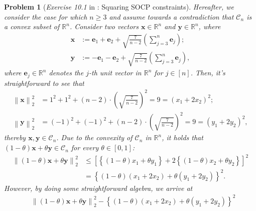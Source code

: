 \documentclass[11pt]{article}
\newtheorem{problem}{Problem}
\numberwithin{equation}{problem}
\begin{document}
\begin{problem} [\emph{Exercise 10.1} in \cite{calafiore2014optimization}: Squaring SOCP constraints]
{\indent Hereafter, we consider the case for which $n \geq 3$ and assume towards a contradiction that $\mathcal{C}_n$ is a convex subset of $\mathbb{R}^n$. Consider two vectors $\mathbf{x} \in \mathbb{R}^n$ and $\mathbf{y} \in \mathbb{R}^n$, where
\begin{equation*}
    \begin{split}
        \mathbf{x} &:= \mathbf{e}_1 + \mathbf{e}_2 + \sqrt{\frac{7}{n-2}} \left( \sum_{j=3}^{n} \mathbf{e}_j \right); \\
        \mathbf{y} &:= - \mathbf{e}_1 - \mathbf{e}_2 + \sqrt{\frac{7}{n-2}} \left( \sum_{j=3}^{n} \mathbf{e}_j \right),
    \end{split}
\end{equation*}
where $\mathbf{e}_j \in \mathbb{R}^n$ denotes the $j$-th unit vector in $\mathbb{R}^n$ for $j \in [n]$. Then, it's straightforward to see that
\begin{equation}
    \label{eqn1.1}
    \begin{split}
        \left\| \mathbf{x} \right\|_{2}^2 &= 1^2 + 1^2 + (n-2) \cdot \left( \sqrt{\frac{7}{n-2}} \right)^2 = 9 = \left( x_1 + 2 x_2 \right)^2; \\
        \left\| \mathbf{y} \right\|_{2}^2 &= \left( -1 \right)^2 + \left( -1 \right)^2 + (n-2) \cdot \left( \sqrt{\frac{7}{n-2}} \right)^2 = 9 = \left( y_1 + 2 y_2 \right)^2,
    \end{split}
\end{equation}
thereby $\mathbf{x}, \mathbf{y} \in \mathcal{C}_n$. Due to the convexity of $\mathcal{C}_n$ in $\mathbb{R}^n$, it holds that $\left( 1 - \theta \right) \mathbf{x} + \theta \mathbf{y} \in \mathcal{C}_n$ for every $\theta \in [0, 1]$:
\begin{equation}
    \label{eqn1.2}
    \begin{split}
        \left\| \left( 1 - \theta \right) \mathbf{x} + \theta \mathbf{y} \right\|_{2}^2 
        &\leq \left[ \left\{ \left( 1 - \theta \right) x_1 + \theta y_1 \right\} + 2 \left\{ \left( 1 - \theta \right) x_2 + \theta y_2 \right\} \right]^2 \\
        &= \left\{ \left( 1 - \theta \right) \left( x_1 + 2 x_2 \right) + \theta \left( y_1 + 2 y_2 \right) \right\}^2.
    \end{split}
\end{equation}
However, by doing some straightforward algebra, we arrive at
\begin{equation}
    \label{eqn1.3}
    \begin{split}
        &\left\| \left( 1 - \theta \right) \mathbf{x} + \theta \mathbf{y} \right\|_{2}^2 - \left\{ \left( 1 - \theta \right) \left( x_1 + 2 x_2 \right) + \theta \left( y_1 + 2 y_2 \right) \right\}^2 \\

\end{split}
\end{equation}}
\end{problem}
\end{document}

